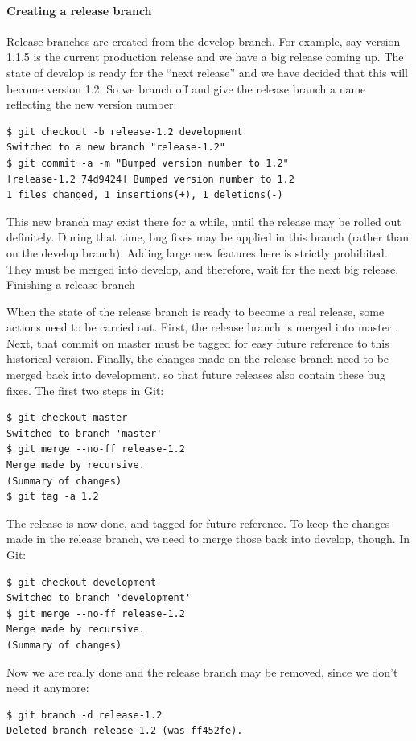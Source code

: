 \paragraph{Creating a release branch}
Release branches are created from the develop branch. For example, say version
1.1.5 is the current production release and we have a big release coming up. The
state of develop is ready for the “next release” and we have decided that this
will become version 1.2. So we branch off and give the release branch a name
reflecting the new version number:
\begin{verbatim}
$ git checkout -b release-1.2 development
Switched to a new branch "release-1.2"
$ git commit -a -m "Bumped version number to 1.2"
[release-1.2 74d9424] Bumped version number to 1.2
1 files changed, 1 insertions(+), 1 deletions(-)
\end{verbatim}

This new branch may exist there for a while, until the release may be rolled out
definitely. During that time, bug fixes may be applied in this branch (rather
than on the develop branch). Adding large new features here is strictly
prohibited. They must be merged into develop, and therefore, wait for the next
big release. Finishing a release branch

When the state of the release branch is ready to become a real release, some
actions need to be carried out. First, the release branch is merged into master .
Next, that commit on master must be tagged for easy future reference to this
historical version. Finally, the changes made on the release branch need to be
merged back into development, so that future releases also contain these bug
fixes. The first two steps in Git:
\begin{verbatim}
$ git checkout master
Switched to branch 'master'
$ git merge --no-ff release-1.2
Merge made by recursive.
(Summary of changes)
$ git tag -a 1.2
\end{verbatim}

The release is now done, and tagged for future reference. To keep the changes
made in the release branch, we need to merge those back into develop, though. In Git:
\begin{verbatim}
$ git checkout development
Switched to branch 'development'
$ git merge --no-ff release-1.2
Merge made by recursive.
(Summary of changes)
\end{verbatim}

Now we are really done and the release branch may be removed, since we don’t
need it anymore:
\begin{verbatim}
$ git branch -d release-1.2
Deleted branch release-1.2 (was ff452fe).
\end{verbatim}

